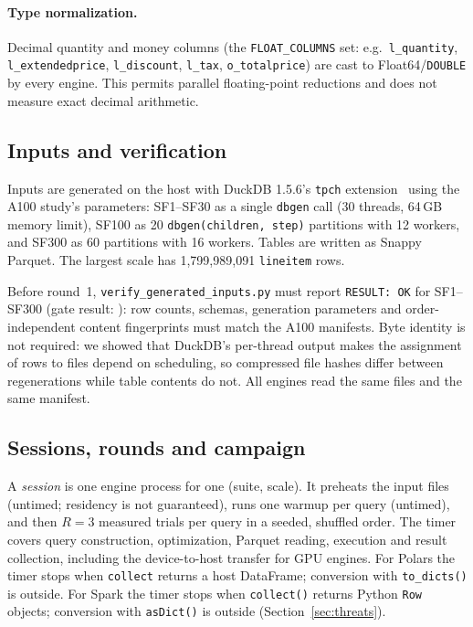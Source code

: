 \documentclass[11pt]{article}
\begin{document}
\paragraph{Type normalization.} Decimal quantity and money columns (the
\texttt{FLOAT\_COLUMNS} set: e.g.\ \texttt{l\_quantity},
\texttt{l\_extendedprice}, \texttt{l\_discount}, \texttt{l\_tax},
\texttt{o\_totalprice}) are cast to Float64/\texttt{DOUBLE} by every engine.
This permits parallel floating-point reductions and does not measure exact
decimal arithmetic.

\subsection{Inputs and verification}
\label{sec:inputs}

Inputs are generated on the host with DuckDB 1.5.6's \texttt{tpch}
extension~\citep{duckdb_tpch_ext} using the A100 study's parameters: SF1--SF30
as a single \texttt{dbgen} call (30 threads, 64\,GB memory limit), SF100 as 20
\texttt{dbgen(children, step)} partitions with 12 workers, and SF300 as 60
partitions with 16 workers. Tables are written as Snappy Parquet. The largest
scale has 1,799,989,091 \texttt{lineitem} rows.

Before round~1, \texttt{verify\_generated\_inputs.py} must report
\texttt{RESULT: OK} for SF1--SF300 (gate result: ): row
counts, schemas, generation parameters and order-independent content
fingerprints must match the A100 manifests. Byte identity is not required:
we showed that DuckDB's per-thread output makes the assignment of rows to files
depend on scheduling, so compressed file hashes differ between regenerations
while table contents do not. All engines read the same files and the same
manifest.

\subsection{Sessions, rounds and campaign}
\label{sec:structure}

A \emph{session} is one engine process for one (suite, scale). It preheats the
input files (untimed; residency is not guaranteed), runs one warmup per query
(untimed), and then $R=3$ measured trials per query in a seeded, shuffled
order. The timer covers query construction, optimization, Parquet reading,
execution and result collection, including the device-to-host transfer for
GPU engines. For Polars the timer stops when \texttt{collect} returns a host
DataFrame; conversion with \texttt{to\_dicts()} is outside. For Spark the timer
stops when \texttt{collect()} returns Python \texttt{Row} objects; conversion
with \texttt{asDict()} is outside (Section~\ref{sec:threats}).
\end{document}
